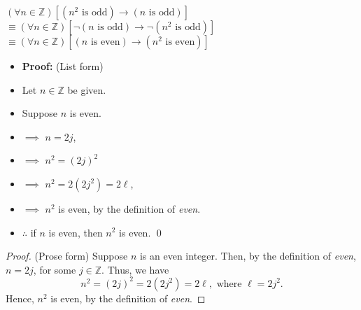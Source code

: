 \begin{Solution}{7.2}
$(\forall n\in\mathbb{Z})[ (n^2 \text{ is odd}) \rightarrow (n \text{ is odd}) ]$ \newline
$   \equiv (\forall n\in\mathbb{Z})[ \lnot(n \text{ is odd}) \rightarrow \lnot(n^2 \text{ is odd}) ]$ \newline
$   \equiv (\forall n\in\mathbb{Z})[ (n \text{ is even}) \rightarrow (n^2 \text{ is even}) ]$
\begin{itemize}[noitemsep, label=$\blacktriangleright$]
    \item \textbf{Proof:} (List form)
    \item Let $n\in\mathbb{Z}$ be given. \\
    \item Suppose  $n$ is even.\\
    \item $\implies$ $n=2j$, %
    \item $\implies$  $n^2=(2j)^2 $
    \item $\implies$  $n^2 = 2(2j^2)=2\ell$, 
    \item $\implies$ $n^2$ is even, by the definition of \textit{even}.
    \item $\therefore$ if $n$ is even, then $n^2$ is even. \qed
\end{itemize}
\begin{proof}(Prose form)
Suppose $n$ is an even integer. Then, by the definition of \textit{even}, $n=2j$, for some $j\in\mathbb{Z}$.
Thus, we have
\[
 n^2 = (2j)^2 = 2(2j^2)= 2\ell, \text{ where $\ell=2j^2$}.
\]
Hence, $n^2$ is even, by the definition of \textit{even}.
\end{proof}
\end{Solution}
